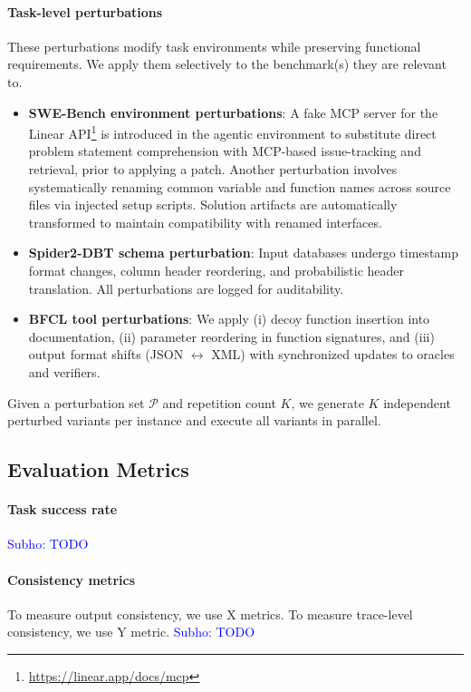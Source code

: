 \documentclass{article}
\newcommand{\sm}[1]{\textcolor{blue}{Subho: #1}}
\theoremstyle{plain}
\theoremstyle{definition}
\theoremstyle{remark}
\begin{document}
\paragraph{Task-level perturbations}
These perturbations modify task environments while preserving functional requirements. We apply them selectively to the benchmark(s) they are relevant to.

\begin{itemize}[nolistsep,leftmargin=*]
    \item \textbf{SWE-Bench environment perturbations}: A fake MCP server for the Linear API\footnote{\url{https://linear.app/docs/mcp}} is introduced in the agentic environment to substitute direct problem statement comprehension with MCP-based issue-tracking and retrieval, prior to applying a patch. Another perturbation involves systematically renaming common variable and function names across source files via injected setup scripts. Solution artifacts are automatically transformed to maintain compatibility with renamed interfaces.
    \item \textbf{Spider2-DBT schema perturbation}: Input databases undergo timestamp format changes, column header reordering, and probabilistic header translation. All perturbations are logged for auditability.
    \item \textbf{BFCL tool perturbations}: We apply (i) decoy function insertion into documentation, (ii) parameter reordering in function signatures, and (iii) output format shifts (JSON $\leftrightarrow$ XML) with synchronized updates to oracles and verifiers.
\end{itemize}

Given a perturbation set $\mathcal{P}$ and repetition count $K$, we generate $K$ independent perturbed variants per instance and execute all variants in parallel.

\subsection{Evaluation Metrics}

\paragraph{Task success rate}
\sm{TODO}

\paragraph{Consistency metrics}
To measure output consistency, we use X metrics.
To measure trace-level consistency, we use Y metric.
\sm{TODO}
\end{document}
